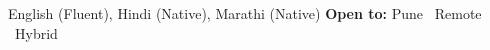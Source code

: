 \documentclass[10pt, a4paper]{article}
\begin{document}
\vspace{4pt}
\textcolor{midgray}{\small English (Fluent), Hindi (Native), Marathi (Native)}
\hfill
{\bfseries\color{darkgray}\small Open to:}
\textcolor{midgray}{\small Pune \textbar\ Remote \textbar\ Hybrid}
\end{document}
